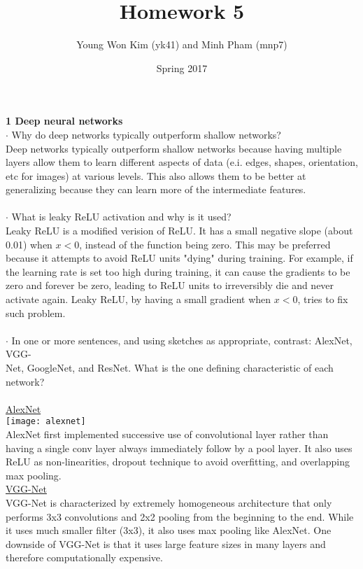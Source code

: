 \documentclass[12pt]{article}
\title{Homework 5}
\author{Young Won Kim (yk41) and Minh Pham (mnp7)}
\date{Spring 2017}
\begin{document}
\maketitle
\noindent \textbf{1 Deep neural networks} \\
$\cdot$ Why do deep networks typically outperform shallow networks?\\
Deep networks typically outperform shallow networks because having multiple layers allow them to learn different aspects of data (e.i. edges, shapes, orientation, etc for images) at various levels. This also allows them to be better at generalizing because they can learn more of the intermediate features. \\
\\
$\cdot$ What is leaky ReLU activation and why is it used?\\
Leaky ReLU is a modified verision of ReLU. It has a small negative slope (about 0.01) when $x<0$, instead of the function being zero. This may be preferred because it attempts to avoid ReLU units "dying" during training. For example, if the learning rate is set too high during training, it can cause the gradients to be zero and forever be zero, leading to ReLU units to irreversibly die and never activate again. Leaky ReLU, by having a small gradient when $x<0$, tries to fix such problem. \\
\\
$\cdot$ In one or more sentences, and using sketches as appropriate, contrast: AlexNet, VGG-\\
Net, GoogleNet, and ResNet. What is the one defining characteristic of each network?\\
\\
\underline{AlexNet}\\
\texttt{[image: alexnet]}\\
AlexNet first implemented successive use of convolutional layer rather than having a single conv layer always immediately follow by a pool layer. It also uses ReLU as non-linearities, dropout technique to avoid overfitting, and overlapping max pooling.\\
\underline{VGG-Net}\\
VGG-Net is characterized by extremely homogeneous architecture that only performs 3x3 convolutions and 2x2 pooling from the beginning to the end. While it uses much smaller filter (3x3), it also uses max pooling like AlexNet. One downside of VGG-Net is that it uses large feature sizes in many layers and therefore computationally expensive.\\
\end{document}

